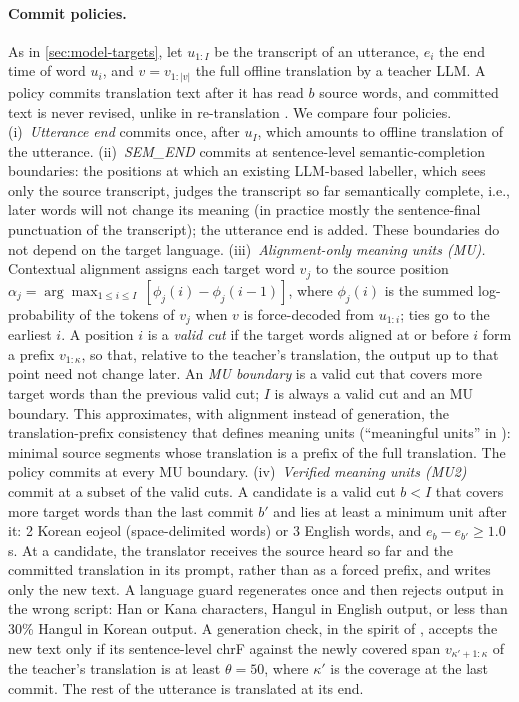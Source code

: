 \paragraph{Commit policies.}
As in \cref{sec:model-targets}, let $u_{1:I}$ be the transcript of an utterance, $e_i$ the end time of word $u_i$, and $v=v_{1:|v|}$ the full offline translation by a teacher LLM. A policy commits translation text after it has read $b$ source words, and committed text is never revised, unlike in re-translation \citep{arivazhagan2020retranslation}. We compare four policies.
(i)~\emph{Utterance end} commits once, after $u_I$, which amounts to offline translation of the utterance.
(ii)~\emph{SEM\_END} commits at sentence-level semantic-completion boundaries: the positions at which an existing LLM-based labeller, which sees only the source transcript, judges the transcript so far semantically complete, i.e., later words will not change its meaning (in practice mostly the sentence-final punctuation of the transcript); the utterance end is added. These boundaries do not depend on the target language.
(iii)~\emph{Alignment-only meaning units (MU).} Contextual alignment \citep{labiausse2025highfidelity} assigns each target word $v_j$ to the source position $\alpha_j=\arg\max_{1\le i\le I}\,[\phi_j(i)-\phi_j(i-1)]$, where $\phi_j(i)$ is the summed log-probability of the tokens of $v_j$ when $v$ is force-decoded from $u_{1:i}$; ties go to the earliest $i$. A position $i$ is a \emph{valid cut} if the target words aligned at or before $i$ form a prefix $v_{1:\kappa}$, so that, relative to the teacher's translation, the output up to that point need not change later. An \emph{MU boundary} is a valid cut that covers more target words than the previous valid cut; $I$ is always a valid cut and an MU boundary. This approximates, with alignment instead of generation, the translation-prefix consistency that defines meaning units (``meaningful units'' in \citealp{zhang2020learning}): minimal source segments whose translation is a prefix of the full translation. The policy commits at every MU boundary.
(iv)~\emph{Verified meaning units (MU2)} commit at a subset of the valid cuts. A candidate is a valid cut $b<I$ that covers more target words than the last commit $b'$ and lies at least a minimum unit after it: 2 Korean eojeol (space-delimited words) or 3 English words, and $e_b-e_{b'}\ge1.0$\,s. At a candidate, the translator receives the source heard so far and the committed translation in its prompt, rather than as a forced prefix, and writes only the new text. A language guard regenerates once and then rejects output in the wrong script: Han or Kana characters, Hangul in English output, or less than 30\% Hangul in Korean output. A generation check, in the spirit of \citet{zhang2020learning}, accepts the new text only if its sentence-level chrF \citep{popovic2015chrf} against the newly covered span $v_{\kappa'+1:\kappa}$ of the teacher's translation is at least $\theta=50$, where $\kappa'$ is the coverage at the last commit. The rest of the utterance is translated at its end.

